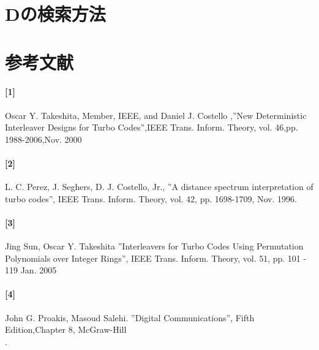 \documentclass[20 pts]{article}
\begin{document}
\section{Dの検索方法}






\section{参考文献}
\paragraph{[1]}  Oscar Y. Takeshita, Member, IEEE, and Daniel J. Costello ,''New Deterministic Interleaver Designs for Turbo Codes'',IEEE Trans. Inform. Theory, vol.  46,pp. 1988-2006,Nov. 2000\\
\paragraph{[2]}  L. C. Perez, J. Seghers, D. J. Costello, Jr., ''A distance spectrum interpretation of turbo codes'', IEEE Trans. Inform. Theory, vol. 42, pp. 1698-1709, Nov. 1996.\\
\paragraph{[3]} Jing Sun, Oscar Y. Takeshita ”Interleavers for Turbo Codes Using Permutation Polynomials over Integer Rings”, IEEE Trans. Inform. Theory, vol. 51,
pp. 101 - 119 Jan. 2005
\paragraph{[4]}   John G. Proakis, Masoud Salehi. ''Digital Communications'', Fifth Edition,Chapter 8, McGraw-Hill\\.
\end{document}
